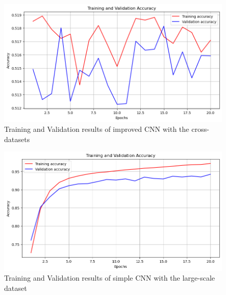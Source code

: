 \documentclass[final]{cvpr}
\begin{document}
\begin{itemize}
   \begin{figure}[t]
      \centering
      \includegraphics[width=0.9\linewidth]{images/ex-cd-improvedcnn-accuracy-results.png}
      \caption{Training and Validation results of improved CNN with the cross-datasets}
      \label{fig:ex-cd-improvedcnn-results}
   \end{figure}

       \begin{figure}[t]
          \centering
          \includegraphics[width=0.9\linewidth]{images/ex-d2-simplecnn-accuracy-results.png}
          \caption{Training and Validation results of simple CNN with the large-scale dataset}
          \label{fig:ex-d2-simplecnn-results}
       \end{figure}
       

\end{itemize}
\end{document}
